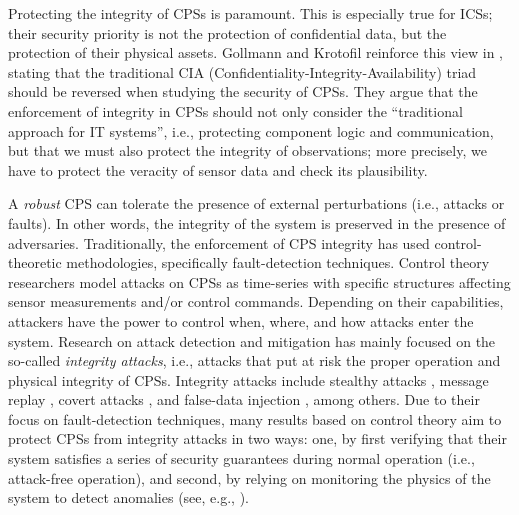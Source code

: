 {

{%
Protecting the integrity of CPSs is paramount. This is especially true for ICSs; their security priority is not the protection of confidential data, but the protection of their physical assets. Gollmann and Krotofil reinforce this view in \cite{CPSSec}, stating that the traditional CIA (Confidentiality-Integrity-Availability) triad should be reversed when studying the security of CPSs. They argue that the enforcement of integrity in CPSs should not only consider the ``traditional approach for IT systems'', {i.e.}, protecting {component logic} and {communication}, but that we must also protect the integrity of {observations}; more precisely, we have to protect the {veracity} of sensor data and check its {plausibility}.} 

A \emph{robust} CPS can tolerate the presence of external perturbations (i.e., attacks or faults). In other words, the integrity of the system is preserved in the presence of adversaries. Traditionally, the enforcement of CPS integrity has  used {control-theoretic methodologies}, specifically {fault-detection techniques}. Control theory researchers model attacks on CPSs as time-series with specific structures affecting sensor measurements and/or control commands. Depending on their capabilities, attackers have the power to control when, where, and how attacks enter the system. Research on attack detection and mitigation has mainly focused on the so-called \emph{integrity attacks}, i.e., attacks that put at risk the proper operation and physical integrity of CPSs. Integrity attacks include stealthy attacks \cite{CPSStealthAttacks}, message replay \cite{CPSReplayAttacks}, covert attacks \cite{CPSCovertAttacks}, and false-data injection \cite{CPSDataInjectionAttacks}, among others. Due to their focus on fault-detection techniques, many results based on control theory aim to protect CPSs from integrity attacks in two ways: one, by first verifying that their system satisfies a series of security guarantees during {normal operation} (i.e., attack-free operation), and second, by relying on {monitoring} the physics of the system to detect anomalies (see, e.g., \cite{CPSInvariantsForDetection,Urbina2016,CPSAttackDetection,CPSAttacksAgainstPCS,CPSIntegrityAttacks,CPSDetectingIntegrityAttacksScada}). 

}
